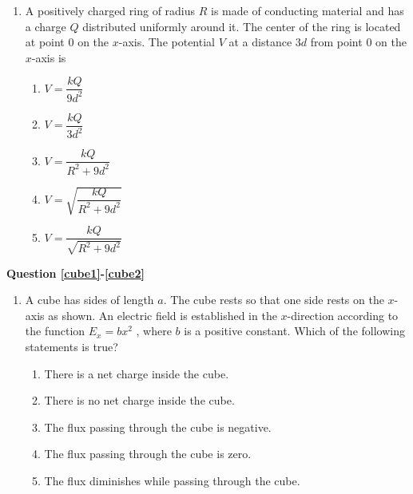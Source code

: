 \documentclass{../../../oss-classkick}
\begin{document}
\begin{multicols}{2}
\begin{enumerate}[leftmargin=18pt]
  \item A positively charged ring of radius $R$ is made of conducting material
    and has a charge $Q$ distributed uniformly around it. The center of the
    ring is located at point $0$ on the $x$-axis. The potential $V$ at a
    distance $3d$ from point $0$ on the $x$-axis is
    \begin{center}
    \end{center}
    \begin{enumerate}[itemsep=4.5pt,leftmargin=18pt,label=(\Alph*)]  
    \item $\displaystyle V=\dfrac{kQ}{9d^2}$
    \item $\displaystyle V=\dfrac{kQ}{3d^2}$
    \item $\displaystyle V=\dfrac{kQ}{R^2+9d^2}$
    \item $\displaystyle V=\sqrt{\dfrac{kQ}{R^2+9d^2}}$
    \item $\displaystyle V=\dfrac{kQ}{\sqrt{R^2+9d^2}}$
    \end{enumerate}
  \end{enumerate}
  \columnbreak
  
  \textbf{Question \ref{cube1}-\ref{cube2}}
  \begin{enumerate}[leftmargin=18pt,resume]
  \item A cube has sides of length $a$. The cube rests so that one side rests on
    the $x$-axis as shown. An electric field is established in the $x$-direction
    according to the function $E_x=bx^2$ , where $b$ is a positive constant.
    Which of the following statements is true?
    \label{cube1}
    \vspace{-.15in}
    \begin{enumerate}[nosep,leftmargin=18pt,label=(\Alph*)]
    \item\vspace{-.2in}There is a net charge inside the cube.
    \item There is no net charge inside the cube.
    \item The flux passing through the cube is negative.
    \item The flux passing through the cube is zero.
    \item The flux diminishes while passing through the cube.
    \end{enumerate}
    \vspace{.7in}
    

\end{enumerate}
\end{multicols}
\end{document}
